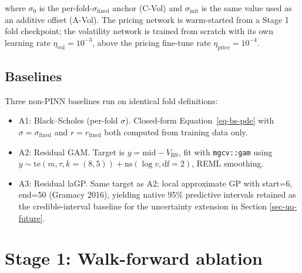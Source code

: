 \documentclass[
  11pt,
]{article}
\providecommand{\tightlist}{%
  \setlength{\itemsep}{0pt}\setlength{\parskip}{0pt}}
\begin{document}
where \(\sigma_0\) is the per-fold-\(\sigma_\mathrm{fixed}\) anchor
(C-Vol) and \(\sigma_\mathrm{init}\) is the same value used as an
additive offset (A-Vol). The pricing network is warm-started from a
Stage 1 fold checkpoint; the volatility network is trained from scratch
with its own learning rate \(\eta_\mathrm{vol} = 10^{-3}\), above the
pricing fine-tune rate \(\eta_\mathrm{price} = 10^{-4}\).

\subsection{Baselines}\label{sec-baselines-method}

Three non-PINN baselines run on identical fold definitions:

\begin{itemize}
\tightlist
\item
  A1: Black--Scholes (per-fold \(\sigma\)). Closed-form
  Equation~\ref{eq-bs-pde} with \(\sigma = \sigma_\mathrm{fixed}\) and
  \(r = r_\mathrm{fixed}\) both computed from training data only.
\item
  A2: Residual GAM. Target is \(y = \mathrm{mid} - V_\mathrm{BS}\), fit
  with \texttt{mgcv::gam} using
  \(y \sim \mathrm{te}(m,\tau,k=(8,5)) + \mathrm{ns}(\log v, \mathrm{df}=2)\),
  REML smoothing.
\item
  A3: Residual laGP. Same target as A2; local approximate GP with
  start=6, end=50 (Gramacy 2016), yielding native 95\% predictive
  intervals retained as the credible-interval baseline for the
  uncertainty extension in Section \ref{sec-uq-future}.
\end{itemize}

\pagebreak

\section{Stage 1: Walk-forward ablation}\label{sec-stage1}
\end{document}
